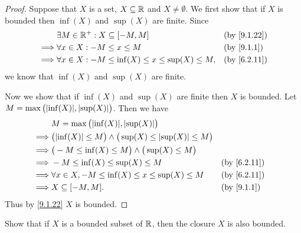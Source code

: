 \begin{proof}
	Suppose that \(X\) is a set, \(X \subseteq \mathbb{R}\) and \(X \neq \emptyset\).
	We first show that if \(X\) is bounded then \(\inf(X)\) and \(\sup(X)\) are finite.
	Since
	\begin{align*}
		         & \exists M \in \R^+ : X \subseteq [-M, M]                      &  & \by{9.1.22} \\
		\implies & \forall x \in X : -M \leq x \leq M                            &  & \by{9.1.1}  \\
		\implies & \forall x \in X : -M \leq \inf(X) \leq x \leq \sup(X) \leq M, &  & \by{6.2.11}
	\end{align*}
	we know that \(\inf(X)\) and \(\sup(X)\) are finite.

	Now we show that if \(\inf(X)\) and \(\sup(X)\) are finite then \(X\) is bounded.
	Let \(M = \max\big(\abs{\inf(X)}, \abs{\sup(X)}\big)\).
	Then we have
	\begin{align*}
		         & M = \max\big(\abs{\inf(X)}, \abs{\sup(X)}\big)                                                    \\
		\implies & \big(\abs{\inf(X)} \leq M\big) \land \big(\sup(X) \leq \abs{\sup(X)} \leq M\big)                  \\
		\implies & \big(-M \leq \inf(X) \leq M\big) \land \big(\sup(X) \leq M\big)                                   \\
		\implies & -M \leq \inf(X) \leq \sup(X) \leq M                                              &  & \by{6.2.11} \\
		\implies & \forall x \in X, -M \leq \inf(X) \leq x \leq \sup(X) \leq M                      &  & \by{6.2.11} \\
		\implies & X \subseteq [-M, M].                                                             &  & \by{9.1.1}
	\end{align*}
	Thus by \cref{9.1.22} \(X\) is bounded.
\end{proof}

\begin{ex}\label{ex:9.1.11}
	Show that if \(X\) is a bounded subset of \(\mathbb{R}\), then the closure \(X\) is also bounded.
\end{ex}


